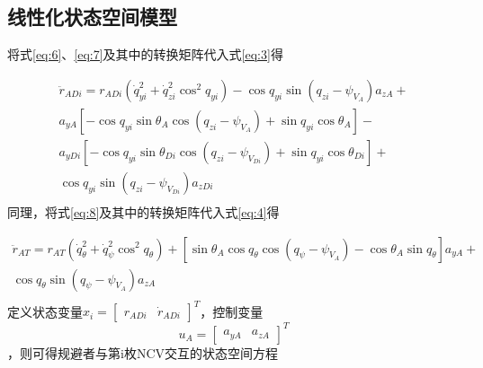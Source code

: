 \subsection{线性化状态空间模型}
将式\eqref{eq:6}、\eqref{eq:7}及其中的转换矩阵代入式\eqref{eq:3}得

\begin{equation}
\label{eq:10}
\begin{gathered}
  {{\ddot r}_{ADi}} = {r_{ADi}}\left( {\dot q_{yi}^2 + \dot q_{zi}^2{{\cos }^2}{q_{yi}}} \right) - \cos {q_{yi}}\sin \left( {{q_{zi}} - {\psi _{{V_A}}}} \right){a_{zA}} +  \\ 
  {a_{yA}}\left[ { - \cos {q_{yi}}\sin {\theta _A}\cos \left( {{q_{zi}} - {\psi _{{V_A}}}} \right) + \sin {q_{yi}}\cos {\theta _A}} \right] -  \\ 
  {a_{yDi}}\left[ { - \cos {q_{yi}}\sin {\theta _{Di}}\cos \left( {{q_{zi}} - {\psi _{{V_{Di}}}}} \right) + \sin {q_{yi}}\cos {\theta _{Di}}} \right] +  \\ 
  \cos {q_{yi}}\sin \left( {{q_{zi}} - {\psi _{{V_{Di}}}}} \right){a_{zDi}} \\ 
\end{gathered}
\end{equation}
同理，将式\eqref{eq:8}及其中的转换矩阵代入式\eqref{eq:4}得

\begin{equation}
\label{eq:11}
\begin{gathered}
  {{\ddot r}_{AT}} = {r_{AT}}\left( {\dot q_\theta ^2 + \dot q_\psi ^2{{\cos }^2}{q_\theta }} \right) + \left[ {\sin {\theta _A}\cos {q_\theta }\cos \left( {{q_\psi } - {\psi _{{V_A}}}} \right) - \cos {\theta _A}\sin {q_\theta }} \right]{a_{yA}} +  \\ 
  \cos {q_\theta }\sin \left( {{q_\psi } - {\psi _{{V_A}}}} \right){a_{zA}} \\ 
\end{gathered}
\end{equation}
定义状态变量${x_i} = {\left[ {\begin{array}{*{20}{c}}
  {{r_{ADi}}}&{{{\dot r}_{ADi}}} 
\end{array}} \right]^T}$，控制变量\[{u_A} = {\left[ {\begin{array}{*{20}{c}}
  {{a_{yA}}}&{{a_{zA}}} 
\end{array}} \right]^T}\]，则可得规避者与第i枚NCV交互的状态空间方程

